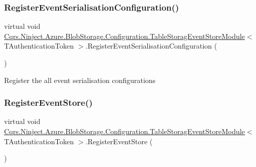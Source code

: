\subsubsection{\texorpdfstring{Register\+Event\+Serialisation\+Configuration()}{RegisterEventSerialisationConfiguration()}}
{\footnotesize\ttfamily virtual void \hyperlink{classCqrs_1_1Ninject_1_1Azure_1_1BlobStorage_1_1Configuration_1_1TableStoragEventStoreModule}{Cqrs.\+Ninject.\+Azure.\+Blob\+Storage.\+Configuration.\+Table\+Storag\+Event\+Store\+Module}$<$ T\+Authentication\+Token $>$.Register\+Event\+Serialisation\+Configuration (\begin{DoxyParamCaption}{ }\end{DoxyParamCaption})\hspace{0.3cm}{\ttfamily [virtual]}}



Register the all event serialisation configurations 

\mbox{\label{classCqrs_1_1Ninject_1_1Azure_1_1BlobStorage_1_1Configuration_1_1TableStoragEventStoreModule_adc8463786567202b9af8af7cf8f40f07_adc8463786567202b9af8af7cf8f40f07}} 
\subsubsection{\texorpdfstring{Register\+Event\+Store()}{RegisterEventStore()}}
{\footnotesize\ttfamily virtual void \hyperlink{classCqrs_1_1Ninject_1_1Azure_1_1BlobStorage_1_1Configuration_1_1TableStoragEventStoreModule}{Cqrs.\+Ninject.\+Azure.\+Blob\+Storage.\+Configuration.\+Table\+Storag\+Event\+Store\+Module}$<$ T\+Authentication\+Token $>$.Register\+Event\+Store (\begin{DoxyParamCaption}{ }\end{DoxyParamCaption})\hspace{0.3cm}{\ttfamily [virtual]}}



